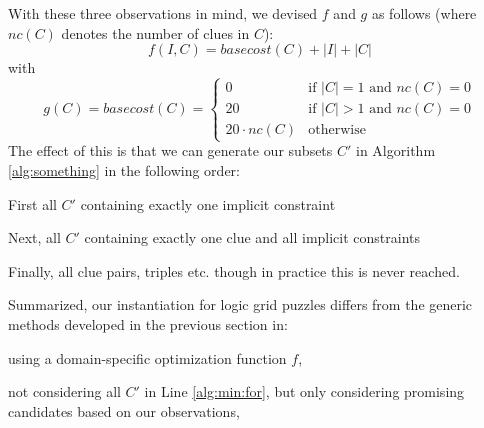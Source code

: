 With these three observations in mind, we devised $f$ and $g$ as follows (where $nc(C)$ denotes the number of clues in $C$): 
\[f(I,C) = basecost(C) + |I| + |C|\] with 
\[g(C) = basecost(C) = \left\{\begin{array}{ll}
                               0 & \text{if $|C|=1$ and $nc(C) = 0$}\\
                               20 & \text{if $|C|>1$ and $nc(C)=0$}\\
                               20\cdot nc(C) & \text{otherwise}
                              \end{array}\right.
                              \]
The effect of this is that we can generate our subsets $C'$ in Algorithm \ref{alg:something} in the following order:
\begin{compactitem}
 \item First all $C'$ containing exactly one implicit constraint
 \item Next, all $C'$ containing exactly one clue and all implicit constraints
 \item Finally, all clue pairs, triples etc. though in practice this is never reached.
\end{compactitem}
Summarized, our instantiation for logic grid puzzles differs from the generic methods developed in the previous section in:
\begin{compactitem}
 \item using a domain-specific optimization function $f$, 
 \item not considering all $C'$ in Line \ref{alg:min:for}, but only considering promising candidates based on our observations,
 \item 
\end{compactitem}




